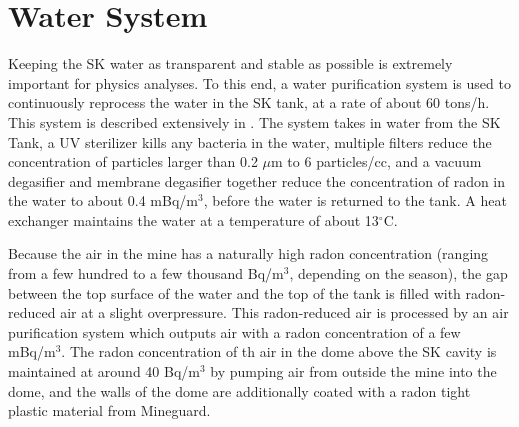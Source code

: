 \section{Water System}
\label{sec:water_system}
Keeping the SK water as transparent and stable as possible is extremely important for physics analyses.  To this end, a water purification system is used to continuously reprocess the water in the SK tank, at a rate of about 60 tons/h.  This system is described extensively in \cite{Fukuda:2002uc}.  The system takes in water from the SK Tank,  a UV sterilizer kills any bacteria in the water, multiple filters reduce the concentration of particles larger than 0.2 $\mu$m to 6 particles/cc, and a vacuum degasifier and membrane degasifier together reduce the concentration of radon in the water to about 0.4 mBq/m$^3$, before the water is returned to the tank. A heat exchanger maintains the water at a temperature of about 13$^\circ$C.  \par
Because the air in the mine has a naturally high radon concentration (ranging from a few hundred to a few thousand Bq/m$^3$, depending on the season), the gap between the top surface of the water and the top of the tank is filled with radon-reduced air at a slight overpressure.  This radon-reduced air is processed by an air purification system which outputs air with a radon concentration of a few mBq/m$^3$.  The radon concentration of th air in the dome above the SK cavity is maintained at around 40 Bq/m$^3$ by pumping air from outside the mine into the dome, and the walls of the dome are additionally coated with a radon tight plastic material from Mineguard.        